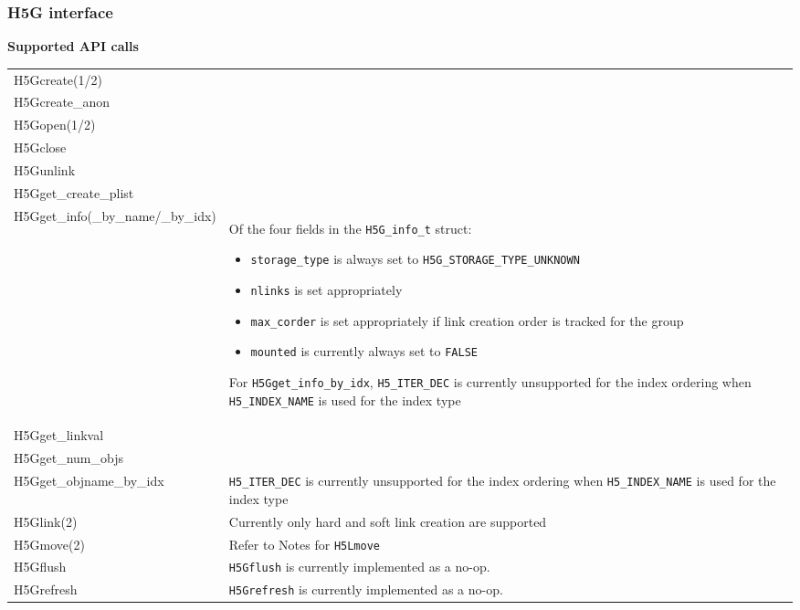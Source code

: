 \documentclass[../users_guide.tex]{subfiles}
\begin{document}
\newpage

\subsubsection{H5G interface}

\begin{center}

\textbf{Supported API calls}
\vspace{.2in} \\

\begin{tabularx}{\linewidth}{| X | >{\RaggedRight}X |}
\hline
\rowcolor{lightgray!50}%
\multicolumn{1}{| c |}{\textbf{API call}} & \multicolumn{1}{c |}{\textbf{Notes}} \\ \hline

H5Gcreate(1/2) & \\ \hline
H5Gcreate\_anon & \\ \hline
H5Gopen(1/2) & \\ \hline
H5Gclose & \\ \hline
H5Gunlink & \\ \hline
H5Gget\_create\_plist & \\ \hline
H5Gget\_info(\_by\_name/\_by\_idx) & Of the four fields in the \texttt{H5G\_info\_t} struct:
                                     \begin{itemize}
                                         \item \texttt{storage\_type} is always set to \texttt{H5G\_STORAGE\_TYPE\_UNKNOWN}
                                         \item \texttt{nlinks} is set appropriately
                                         \item \texttt{max\_corder} is set appropriately if link creation order is tracked for the group
                                         \item \texttt{mounted} is currently always set to \texttt{FALSE}
                                     \end{itemize}
                                     For \texttt{H5Gget\_info\_by\_idx}, \texttt{H5\_ITER\_DEC} is currently unsupported for the index ordering when \texttt{H5\_INDEX\_NAME} is used for the index type\\ \hline
H5Gget\_linkval & \\ \hline
H5Gget\_num\_objs & \\ \hline
H5Gget\_objname\_by\_idx & \texttt{H5\_ITER\_DEC} is currently unsupported for the index ordering when \texttt{H5\_INDEX\_NAME} is used for the index type\\ \hline
H5Glink(2) & Currently only hard and soft link creation are supported\footnotemark[2]\\ \hline
H5Gmove(2) & Refer to Notes for \texttt{H5Lmove}\\ \hline
H5Gflush & \texttt{H5Gflush} is currently implemented as a no-op.\\ \hline
H5Grefresh & \texttt{H5Grefresh} is currently implemented as a no-op.\\ \hline


\end{tabularx}
\end{center}
\end{document}
